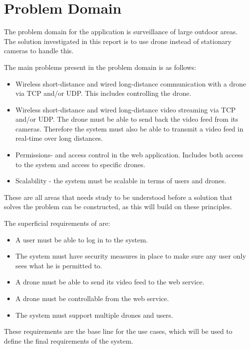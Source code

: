 \section{Problem Domain}
The problem domain for the application is surveillance of large outdoor areas.
The solution investigated in this report is to use drone instead of stationary cameras to handle this.

The main problems present in the problem domain is as follows:
\begin{itemize}
	\item Wireless short-distance and wired long-distance communication with a drone via TCP and/or UDP. This includes controlling the drone.
	\item Wireless short-distance and wired long-distance video streaming via TCP and/or UDP. The drone must be able to send back the video feed from its cameras. Therefore the system must also be able to transmit a video feed in real-time over long distances. 
	\item Permissions- and access control in the web application. Includes both access to the system and access to specific drones.
	\item Scalability - the system must be scalable in terms of users and drones.
\end{itemize}

These are all areas that needs study to be understood before a solution that solves the problem can be constructed, as this will build on these principles.

The superficial requirements of \projectname{} are:

\begin{itemize}
	\item A user must be able to log in to the system.
	\item The system must have security measures in place to make sure any user only sees what he is permitted to. 
	\item A drone must be able to send its video feed to the web service.
	\item A drone must be controllable from the web service. 
	\item The system must support multiple drones and users. 
\end{itemize}

These requirements are the base line for the use cases, which will be used to define the final requirements of the system. 
